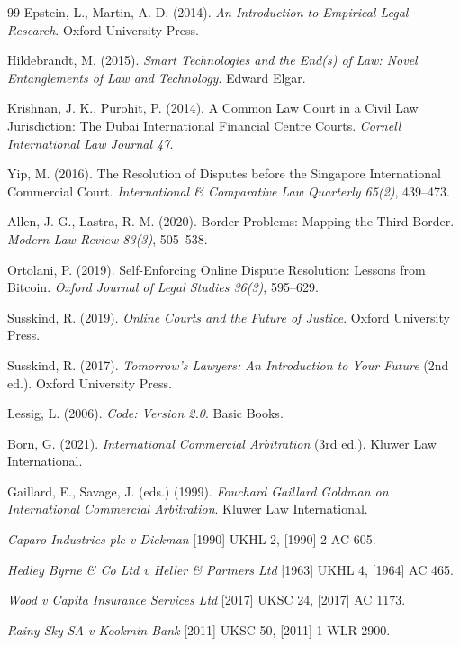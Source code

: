 \documentclass[11pt,letterpaper]{article}
\begin{document}
\begin{thebibliography}{99}
Epstein, L., Martin, A. D. (2014). \textit{An Introduction to Empirical Legal Research}. Oxford University Press.

Hildebrandt, M. (2015). \textit{Smart Technologies and the End(s) of Law: Novel Entanglements of Law and Technology}. Edward Elgar.

Krishnan, J. K., Purohit, P. (2014). A Common Law Court in a Civil Law Jurisdiction: The Dubai International Financial Centre Courts. \textit{Cornell International Law Journal 47}.

Yip, M. (2016). The Resolution of Disputes before the Singapore International Commercial Court. \textit{International \& Comparative Law Quarterly 65(2)}, 439--473.

Allen, J. G., Lastra, R. M. (2020). Border Problems: Mapping the Third Border. \textit{Modern Law Review 83(3)}, 505--538.

Ortolani, P. (2019). Self-Enforcing Online Dispute Resolution: Lessons from Bitcoin. \textit{Oxford Journal of Legal Studies 36(3)}, 595--629.

Susskind, R. (2019). \textit{Online Courts and the Future of Justice}. Oxford University Press.

Susskind, R. (2017). \textit{Tomorrow's Lawyers: An Introduction to Your Future} (2nd ed.). Oxford University Press.

Lessig, L. (2006). \textit{Code: Version 2.0}. Basic Books.

Born, G. (2021). \textit{International Commercial Arbitration} (3rd ed.). Kluwer Law International.

Gaillard, E., Savage, J. (eds.) (1999). \textit{Fouchard Gaillard Goldman on International Commercial Arbitration}. Kluwer Law International.

\textit{Caparo Industries plc v Dickman} [1990] UKHL 2, [1990] 2 AC 605.

\textit{Hedley Byrne \& Co Ltd v Heller \& Partners Ltd} [1963] UKHL 4, [1964] AC 465.

\textit{Wood v Capita Insurance Services Ltd} [2017] UKSC 24, [2017] AC 1173.

\textit{Rainy Sky SA v Kookmin Bank} [2011] UKSC 50, [2011] 1 WLR 2900.


\end{thebibliography}
\end{document}

